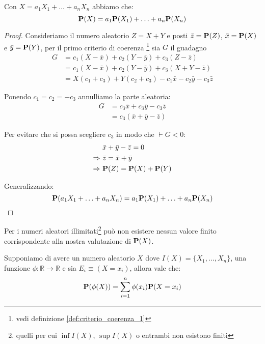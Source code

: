 \begin{proposition}\label{pro:linearita_previsione}
  Con \( X = a_1 X_1 + \ldots + a_n X_n \) abbiamo che:
  \[ \mathbf{P}(X) = a_1 \mathbf{P}(X_1) + \ldots + a_n \mathbf{P}(X_n) \]
\end{proposition}

\begin{proof}
  Consideriamo il numero aleatorio \( Z = X + Y \) e posti \( \bar{z} = \mathbf{P}(Z) \), \( \bar{x} = \mathbf{P}(X) \) e \( \bar{y} = \mathbf{P}(Y) \),
  per il primo criterio di coerenza
  \footnote{vedi definizione \ref{def:criterio_coerenza_1}}
  sia \( G \) il guadagno
  \begin{align*}
    G &= c_1(X - \bar{x}) + c_2(Y - \bar{y}) + c_3(Z - \bar{z}) \\
    &= c_1(X - \bar{x}) + c_2(Y - \bar{y}) + c_3(X + Y - \bar{z}) \\
    &= X(c_1 + c_3) + Y(c_2 + c_3) - c_1\bar{x} - c_2\bar{y} - c_3\bar{z}
  \end{align*}

  Ponendo \( c_1 = c_2 = - c_3 \) annulliamo la parte aleatoria:
  \begin{align*}
    G &= c_3 \bar{x} + c_3 \bar{y} - c_3 \bar{z} \\
    &= c_3(\bar{x} + \bar{y} - \bar{z})
  \end{align*}

  Per evitare che si possa scegliere $c_3$ in modo che \( \vdash G < 0 \):
  \begin{align*}
    & \bar{x} + \bar{y} - \bar{z} = 0 \\
    \Rightarrow ~ & \bar{z} = \bar{x} + \bar{y} \\
    \Rightarrow ~ & \mathbf{P}(Z) = \mathbf{P}(X) + \mathbf{P}(Y)
  \end{align*}

  Generalizzando:
  \[ \mathbf{P}(a_1 X_1 + \ldots + a_n X_n) = a_1 \mathbf{P}(X_1) + \ldots + a_n \mathbf{P}(X_n) \]
\end{proof}

Per i numeri aleatori illimitati\footnote{quelli per cui \( \inf I(X) \), \( \sup I(X) \) o entrambi non esistono finiti} può non esistere nessun valore finito corrispondente alla nostra valutazione di \( \mathbf{P}(X) \).

\begin{proposition}
  Supponiamo di avere un numero aleatorio $X$ dove \( I(X) = \{ X_1, \ldots, X_n \} \), una funzione \( \phi : \mathbb{R} \to \mathbb{R} \) e sia \( E_i \equiv (X = x_i) \), allora vale che:
  \[ \mathbf{P}(\phi(X)) = \sum_{i=1}^{n} \phi(x_i) \mathbf{P}(X = x_i) \]
\end{proposition}

